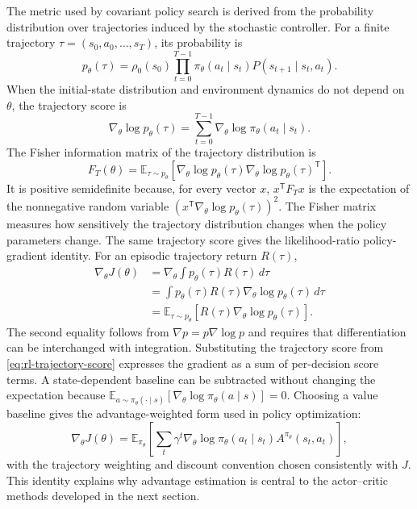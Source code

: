 The metric used by covariant policy search is derived from the probability
distribution over trajectories induced by the stochastic controller. For a
finite trajectory $\tau=(s_0,a_0,\ldots,s_T)$, its probability is
\begin{equation}
    p_\theta(\tau)
    =\rho_0(s_0)
      \prod_{t=0}^{T-1}
      \pi_\theta(a_t\mid s_t)P(s_{t+1}\mid s_t,a_t).
    \label{eq:rl-trajectory-probability}
\end{equation}
When the initial-state distribution and environment dynamics do not depend on
$\theta$, the trajectory score is
\begin{equation}
    \nabla_\theta\log p_\theta(\tau)
    =\sum_{t=0}^{T-1}
      \nabla_\theta\log\pi_\theta(a_t\mid s_t).
    \label{eq:rl-trajectory-score}
\end{equation}
The Fisher information matrix of the trajectory distribution is
\begin{equation}
    F_T(\theta)
    =\mathbb{E}_{\tau\sim p_\theta}
      \left[
      \nabla_\theta\log p_\theta(\tau)
      \nabla_\theta\log p_\theta(\tau)^{\mathsf T}
      \right].
    \label{eq:rl-trajectory-fisher}
\end{equation}
It is positive semidefinite because, for every vector $x$,
$x^{\mathsf T}F_Tx$ is the expectation of the nonnegative random variable
$(x^{\mathsf T}\nabla_\theta\log p_\theta(\tau))^2$. The Fisher matrix measures
how sensitively the trajectory distribution changes when the policy parameters
change.
The same trajectory score gives the likelihood-ratio policy-gradient identity. For an episodic trajectory return $R(\tau)$,
\begin{align}
    \nabla_\theta J(\theta)
    &=\nabla_\theta\int p_\theta(\tau)R(\tau)\,d\tau\\
    &=\int p_\theta(\tau)R(\tau)
      \nabla_\theta\log p_\theta(\tau)\,d\tau\\
    &=\mathbb{E}_{\tau\sim p_\theta}
      \left[R(\tau)\nabla_\theta\log p_\theta(\tau)\right].
    \label{eq:rl-score-function-gradient}
\end{align}
The second equality follows from $\nabla p=p\nabla\log p$ and requires that differentiation can be interchanged with integration. Substituting the trajectory score from \cref{eq:rl-trajectory-score} expresses the gradient as a sum of per-decision score terms. A state-dependent baseline can be subtracted without changing the expectation because $\mathbb{E}_{a\sim\pi_\theta(\cdot\mid s)}[\nabla_\theta\log\pi_\theta(a\mid s)]=0$. Choosing a value baseline gives the advantage-weighted form used in policy optimization:
\begin{equation}
    \nabla_\theta J(\theta)
    =\mathbb{E}_{\pi_\theta}
      \left[\sum_t \gamma^t\nabla_\theta\log\pi_\theta(a_t\mid s_t)
      A^{\pi_\theta}(s_t,a_t)\right],
    \label{eq:rl-advantage-policy-gradient}
\end{equation}
with the trajectory weighting and discount convention chosen consistently with $J$. This identity explains why advantage estimation is central to the actor--critic methods developed in the next section.

